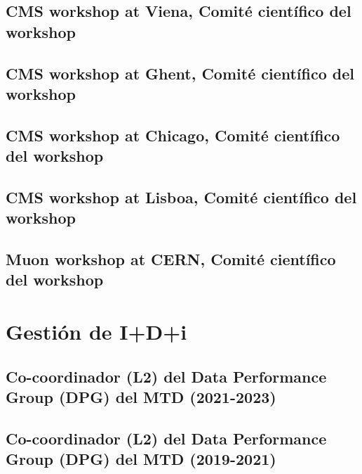 \documentclass[a4paper, 11pt, twoside, openright]{report}
\begin{document}
\subsection{CMS workshop at Viena, Comité científico del workshop}


\subsection{CMS workshop at Ghent, Comité científico del workshop}


\subsection{CMS workshop at Chicago, Comité científico del workshop}


\subsection{CMS workshop at Lisboa, Comité científico del workshop}

\subsection{Muon workshop at CERN, Comité científico del workshop}


\section{Gestión de I+D+i}

\subsection{Co-coordinador (L2) del Data Performance Group (DPG) del MTD (2021-2023)}


\subsection{Co-coordinador (L2) del Data Performance Group (DPG) del MTD (2019-2021)}

\end{document}
